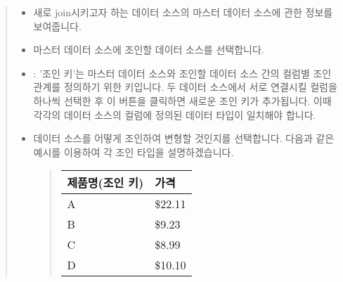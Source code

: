 \documentclass[letterpaper,10pt,english]{sphinxmanual}
\begin{document}
\begin{enumerate}
\begin{quote}
\begin{figure}[H]
\noindent{}
\end{figure}
\begin{itemize}
\item {} 
 새로 join시키고자 하는 데이터 소스의 마스터 데이터 소스에 관한 정보를 보여줍니다.

\item {} 
 마스터 데이터 소스에 조인할 데이터 소스를 선택합니다.

\item {} 
: '조인 키'는 마스터 데이터 소스와 조인할 데이터 소스 간의 컬럼별 조인 관계를 정의하기 위한 키입니다. 두 데이터 소스에서 서로 연결시킬 컬럼을 하나씩 선택한 후 이 버튼을 클릭하면 새로운 조인 키가 추가됩니다. 이때 각각의 데이터 소스의 컬럼에 정의된 데이터 타입이 일치해야 합니다.

\item {} 
 데이터 소스를 어떻게 조인하여 변형할 것인지를 선택합니다. 다음과 같은 예시를 이용하여 각 조인 타입을 설명하겠습니다.
\begin{quote}


\begin{savenotes}\sphinxattablestart
\centering
{}
\sphinxthecaptionisattop
{}\label{\detokenize{discovery/part04/create_a_dashboard:id2}}
\sphinxaftertopcaption
\begin{tabulary}{\linewidth}[t]{|T|T|}
\hline
\sphinxstyletheadfamily 
제품명(조인 키)
&\sphinxstyletheadfamily 
가격
\\
\hline
A
&
\$22.11
\\
\hline
B
&
\$9.23
\\
\hline
C
&
\$8.99
\\
\hline
D
&
\$10.10
\\
\hline
\end{tabulary}
\par
\sphinxattableend\end{savenotes}



\end{quote}
\end{itemize}
\end{quote}
\end{enumerate}
\end{document}
